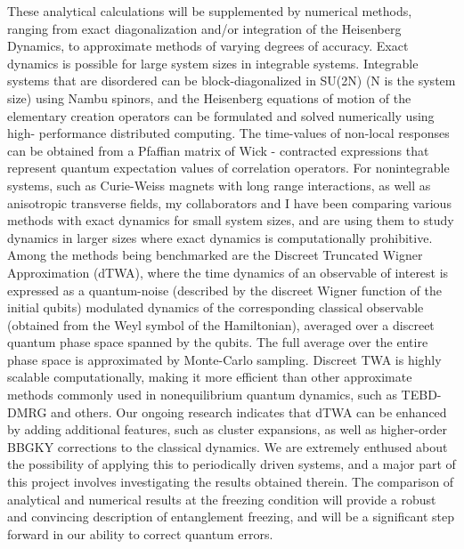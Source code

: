 \documentclass[a4paper,9pt]{article}
\begin{document}
These analytical calculations will be supplemented by numerical methods, ranging from exact diagonalization and/or integration of the Heisenberg Dynamics, to approximate methods of varying degrees of accuracy. Exact dynamics is possible for large system sizes in integrable systems. Integrable systems that are disordered  can be block-diagonalized in SU(2N) (N is the system size) using Nambu spinors, and the Heisenberg equations of motion of the elementary creation operators can be formulated and solved numerically using high- performance distributed computing. The time-values of non-local responses can be obtained from a Pfaffian matrix of Wick - contracted expressions that represent quantum expectation values of correlation operators. For nonintegrable systems, such as Curie-Weiss magnets with long range interactions, as well as anisotropic transverse fields, my collaborators and I have been comparing various methods with exact dynamics for small system sizes, and are using them to study dynamics in larger sizes where exact dynamics is computationally prohibitive. Among the methods being benchmarked are the Discreet Truncated Wigner Approximation (dTWA), where the time dynamics of an observable of interest is expressed as a quantum-noise (described by the discreet Wigner function of the initial qubits) modulated dynamics of the corresponding classical observable (obtained from the Weyl symbol of the Hamiltonian), averaged over a discreet quantum phase space spanned by the qubits. The full average over the entire phase space is approximated by Monte-Carlo sampling. Discreet TWA is highly scalable computationally, making it more efficient than other approximate methods commonly used in nonequilibrium quantum dynamics, such as TEBD-DMRG and others. Our ongoing research indicates that dTWA can be enhanced by adding additional features, such as cluster expansions, as well as higher-order BBGKY corrections to the classical dynamics. We are extremely enthused about the possibility of applying this to periodically driven systems, and a major part of this project involves investigating the results obtained therein. The comparison of analytical and numerical results at the freezing condition will provide a robust and convincing description of entanglement freezing, and will be a significant step forward in our ability to correct quantum errors.
\end{document}
